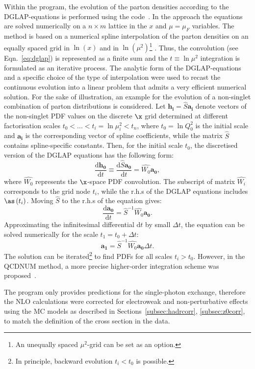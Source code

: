 Within the \herafitter program, the evolution of the parton densities according to the DGLAP-equations is performed using the \qcdnum code~\cite{Botje:2010ay}. In the \qcdnum approach the equations are solved numerically on a $n\times m$ lattice in the $x$ and $\mu=\mu_F$ variables. The method is based on a numerical spline interpolation of the parton densities on an equally spaced grid in $\ln\left(x\right)$ and in $\ln\left(\mu^2\right)$\footnote{An unequally spaced $\mu^2$-grid can be set as an option.} . Thus, the convolution (see Eqn.~\eqref{eq:dglap}) is represented as a finite sum and the $t \equiv \ln{\mu^2}$ integration is formulated as an iterative process.
The analytic form of the DGLAP-equations and a specific choice of the type of interpolation were used to recast the continuous evolution into a linear problem that admits a very efficient numerical solution. For the sake of illustration, an example for the evolution of a non-singlet combination of parton distributions is considered. Let $\mathbf{h_i}=\hat{S}\mathbf{a_i}$ denote vectors of the non-singlet PDF values on the discrete $\x$ grid determined at different factorisation scales $t_0 < ... < t_i=\ln{\mu^2_i} < t_n$, where $t_0=\ln{Q^2_0}$ is the initial scale and $\mathbf{a_i}$ is the corresponding vector of spline coefficients, while the matrix $\hat{S}$ contains spline-specific constants. Then, for the initial scale $t_0$, the discretised version of the DGLAP equations has the following form:
\begin{equation}
 \frac{\mathrm{d}\mathbf{h_0}}{\mathrm{d}t} \equiv \frac{\mathrm{d}\hat{S}\mathbf{a_0}}{\mathrm{d}t} = \hat{W_0}\mathbf{a_0},
\end{equation}
where $\hat{W_0}$ represents the $\x$-space PDF convolution. The subscript of matrix $\hat{W_i}$ corresponds to the grid node $t_i$, while the r.h.s of the DGLAP equations includes $\as\left(t_i\right)$. Moving $\hat{S}$ to the r.h.s of the equation gives:
\begin{equation}
 \frac{\mathrm{d}\mathbf{a_0}}{\mathrm{d}t} = \hat{S}^{-1}\hat{W_0}\mathbf{a_0}.
\end{equation}
Approximating the infinitesimal differential $\mathrm{d}t$ by small $\Delta t$, the equation can be solved numerically for the scale $t_1=t_0+\Delta t$:
\begin{equation}
 \mathbf{a_1} = \hat{S}^{-1}\hat{W_0}\mathbf{a_0}\Delta t.
\end{equation}
The solution can be iterated\footnote{In principle, backward evolution $t_i<t_0$ is possible.} to find PDFs for all scales $t_i>t_0$. However, in the QCDNUM method, a more precise higher-order integration scheme was proposed~\cite{Botje:2010ay}.

The \nlojet program only provides predictions for the single-photon exchange, therefore the NLO calculations were corrected for electroweak and non-perturbative effects using the MC models as described in Sections~\ref{subsec:hadrcorr}, \ref{subsec:z0corr}, to match the definition of the cross section in the data.
